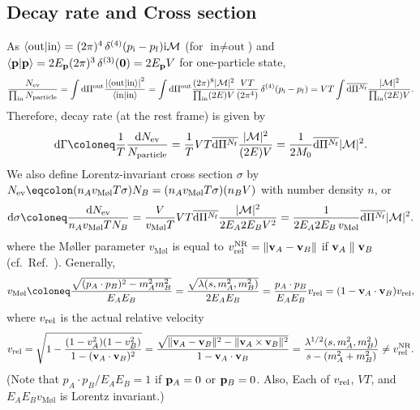 \documentclass[CheatSheet]{subfiles}
\begin{document}
\subsection{Decay rate and Cross section}
As
$\braket{\text{out}|\text{in}}=(2\pi)^4\diracdelta[4](p\w i-p\w f)\ii\mathcal M$
(for $\text{in}\neq\text{out}$) and $\braket{\vc p|\vc p}=2E_{\vc p}(2\pi)^3\diracdelta[3](\vc 0)=2E_\vc {p}V$ for one-particle state,
\begin{equation}
 \frac{N\w{ev}}{\prod\w{in} N\w{particle}}
= \int\dd\Pi^{\mathrm{out}}\frac{\left|\braket{\text{out}|\text{in}}\right|^2}{\braket{\text{in}|\text{in}}}
= \int\dd\Pi^{\mathrm{out}}\frac{(2\pi)^8|\mathcal M|^2}{\prod\w{in}(2E)V}
\frac{VT}{(2\pi^4)}\diracdelta[4](p\w i-p\w f)
= VT\int\overline{\dd\Pi^{N\w f}}\frac{|\mathcal M|^2}{\prod\w{in}(2E)V}.
\end{equation}
Therefore, decay rate (at the rest frame) is given by
\begin{equation}
 \dd\Gamma
\coloneq  \frac{1}{T}\frac{\dd N\w{ev}}{N\w{particle}}
 = \frac{1}{T}VT\overline{\dd\Pi^{N\w f}}\frac{|\mathcal M|^2}{(2E)V}
 = \frac{1}{2M_0}\overline{\dd\Pi^{N\w f}}{|\mathcal M|^2}.
\end{equation}
We also define Lorentz-invariant cross section $\sigma$ by $N\w{ev}\eqcolon(n_A v_{\text{M\o l}}T\sigma)N_B=(n_A v_{\text{M\o l}}T\sigma)(n_B V)$ with
number density $n$, or
\begin{equation}
\dd\sigma\coloneq \frac{\dd N\w{ev}}{n_A v_{\text{M\o l}}TN_B}
=
\frac{V}{v_{\text{M\o l}}T}
VT\overline{\dd\Pi^{N\w f}}\frac{|\mathcal M|^2}{2E_A2E_BV^2}
=
\frac{1}{2E_A2E_B\,v_{\text{M\o l}}}
\overline{\dd\Pi^{N\w f}}|\mathcal M|^2.
\end{equation}
where the M\o ller parameter $v_{\text{M\o l}}$ is equal to $v^{\mathrm{NR}}\w{rel}=\|\vc v_A-\vc v_B\|$ if ${\mathbf{v}}_A\parallel{\mathbf{v}}_B$ (cf.~Ref.~\cite{Cannoni:2016hro}).
Generally,
\begin{equation}
  v_{\text{M\o l}}\coloneq 
 \frac{\sqrt{(p_A\cdot p_B)^2-m_A^2m_B^2}}{E_AE_B}
=\frac{\sqrt{\Kallen(s,m_A^2,m_B^2)}}{2E_AE_B}
=\frac{p_A\cdot p_B}{E_A E_B}v\w{rel}
=({1-\vc v_A\cdot\vc v_B})v\w{rel},
\end{equation}
where $v\w{rel}$ is the actual relative velocity
\begin{equation}
  v\w{rel}
=\sqrt{1-\frac{(1-v_A^2)(1-v_B^2)}{1-(\vc v_A\cdot\vc v_B)^2}}
=\frac{\sqrt{\|\vc v_A-\vc v_B\|^2-\|\vc v_A\times\vc v_B\|^2}}{1-\vc v_A\cdot\vc v_B}
=\frac{\Kallen[1/2](s,m_A^2,m_B^2)}{s-(m_A^2+m_B^2)}\neq v^{\mathrm{NR}}\w{rel}.
\end{equation}
(Note that $p_A\cdot p_B/E_AE_B=1$ if ${\mathbf{p}}_A=0$ or ${\mathbf{p}}_B=0$. Also, Each of $v\w{rel}$, $VT$, and $E_AE_Bv_{\text{M\o l}}$ is Lorentz invariant.)
\end{document}
